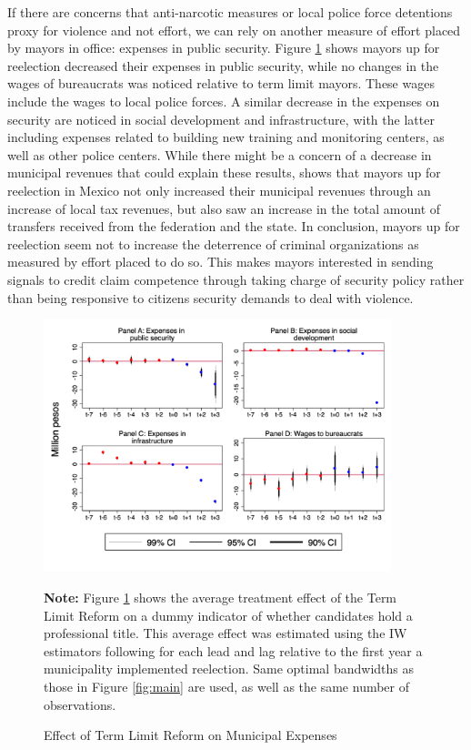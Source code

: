 \documentclass[12pt]{amsart}
\numberwithin{equation}{section}
\theoremstyle{definition}
\theoremstyle{definition}
\theoremstyle{definition}
\begin{document}
If there are concerns that anti-narcotic measures or local police force detentions proxy for violence and not effort, we can rely on another measure of effort placed by mayors in office: expenses in public security. Figure \ref{fig:expenses} shows mayors up for reelection decreased their expenses in public security, while no changes in the wages of bureaucrats was noticed relative to term limit mayors. These wages include the wages to local police forces. A similar decrease in the expenses on security are noticed in social development and infrastructure, with the latter including expenses related to building new training and monitoring centers, as well as other police centers. While there might be a concern of a decrease in municipal revenues that could explain these results, \citet{ch_2021} shows that mayors up for reelection in Mexico not only increased their municipal revenues through an increase of local tax revenues, but also saw an increase in the total amount of transfers received from the federation and the state. In conclusion, mayors up for  reelection seem not to increase the deterrence of criminal organizations as measured by effort placed to do so. This makes mayors interested in sending signals to credit claim competence through taking charge of security policy rather than being responsive to citizens security demands to deal with violence. 

 \begin{figure}[h]   
\centering
 \caption{Effect of Term Limit Reform on Municipal Expenses}
 \label{fig:expenses}
\includegraphics[width=0.9\textwidth]{Figures/expenses_allyears.png}
       \captionsetup{justification=centering}
         
 \textbf{Note:} Figure \ref{fig:expenses} shows the average treatment effect of the Term Limit Reform on a dummy indicator of whether candidates hold a professional title. This average effect was estimated using the IW estimators following \citet{abraham_sun_2020} for each lead and lag relative to the first year a municipality implemented reelection. Same optimal bandwidths as those in Figure \ref{fig:main} are used, as well as the same number of observations.  
              
\end{figure}   
\end{document}
